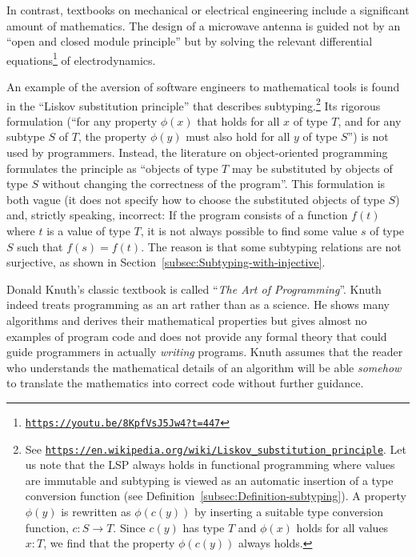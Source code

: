 In contrast, textbooks on mechanical or electrical engineering include
a significant amount of mathematics. The design of a microwave antenna
is guided not by an \textsf{``}open and closed module principle\textsf{''} but by
solving the relevant differential equations\footnote{\texttt{\href{https://youtu.be/8KpfVsJ5Jw4?t=447}{https://youtu.be/8KpfVsJ5Jw4?t=447}}}
of electrodynamics.

An example of the aversion of software engineers to mathematical tools
is found in the \textsf{``}Liskov substitution principle\textsf{''}
that describes subtyping.\footnote{See \texttt{\href{https://en.wikipedia.org/wiki/Liskov_substitution_principle}{https://en.wikipedia.org/wiki/Liskov\_substitution\_principle}}.
Let us note that the LSP always holds in functional programming where
values are immutable and subtyping is viewed as an automatic insertion
of a type conversion function (see Definition~\ref{subsec:Definition-subtyping}).
A property $\phi(y)$ is rewritten as $\phi(c(y))$ by inserting a
suitable type conversion function, $c:S\rightarrow T$. Since $c(y)$
has type $T$ and $\phi(x)$ holds for all values $x:T$, we find
that the property $\phi(c(y))$ always holds.} Its rigorous formulation (\textsf{``}for any property $\phi(x)$ that holds
for all $x$ of type $T$, and for any subtype $S$ of $T$, the property
$\phi(y)$ must also hold for all $y$ of type $S$\textsf{''}) is not used
by programmers. Instead, the literature on object-oriented programming
formulates the principle as \textsf{``}objects of type $T$ may be substituted
by objects of type $S$ without changing the correctness of the program\textsf{''}.
This formulation  is both vague
(it does not specify how to choose the substituted objects of type
$S$) and, strictly speaking, incorrect: If the program consists of
a function $f(t)$ where $t$ is a value of type $T$, it is not always
possible to find some value $s$ of type $S$ such that $f(s)=f(t)$.
The reason is that some subtyping relations are not surjective, as
shown in Section~\ref{subsec:Subtyping-with-injective}.

Donald Knuth\textsf{'}s classic textbook is called \textsf{``}\emph{The Art of Programming}\textsf{''}.
Knuth indeed treats programming as an art rather than as a science.
He shows many algorithms and derives their mathematical properties
but gives almost no examples of program code and does not provide
any formal theory that could guide programmers in actually \emph{writing}
programs. Knuth assumes that the reader who understands the mathematical
details of an algorithm will be able \emph{somehow} to translate the
mathematics into correct code without further guidance.%
\begin{comment}
His books do not propose a formalism that could guide the process
of writing programs (say, choosing the data types to be used), similarly
to how calculations with \textsf{``}Green\textsf{'}s functions\textsf{''} in electrodynamics
are at the foundation of the design of a radar, while calculations
in theoretical mechanics involving \textsf{``}non-holonomic constraints\textsf{''}
are at the foundation of the design of a robot arm.
\end{comment}

